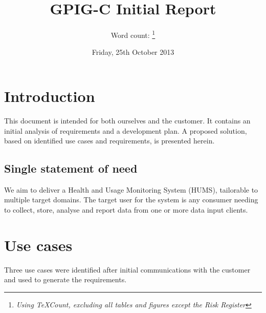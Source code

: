 \documentclass[10pt,a4paper]{article}
\begin{document}
\title{\vspace{-2cm}GPIG-C Initial Report\vspace{-0.7cm}}
\author{\fontsize{7}{8pt}Word count: \footnote{\textit{Using TeXCount, excluding all tables and figures except the Risk Register}}}
\date{\vspace{-0.6cm}\fontsize{7}{6pt}Friday, 25th October 2013}
\maketitle
\vspace{-0.4cm}
\hline %
\thispagestyle{fancy} %

\section{Introduction} %
This document is intended for both ourselves and the customer. It contains
an initial analysis of requirements and a development plan. A proposed solution,
based on identified use cases and requirements, is presented herein.
 
\subsection{Single statement of need} %
We aim to deliver a Health and Usage Monitoring System (HUMS), tailorable to
multiple target domains. The target user for the system is any consumer needing
to collect, store, analyse and report data from one or more data input clients.

\section{Use cases}
Three use cases were identified after initial communications with the customer and used to generate the requirements. 
\end{document}
